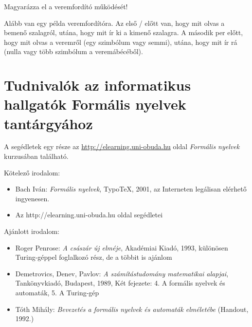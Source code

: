 \documentclass[a4paper]{article}
\begin{document}
Magyarázza el a veremfordító  működését!

Alább van egy példa veremfordítóra. Az első / előtt van, hogy mit olvas
a bemenő szalagról, utána, hogy mit ír ki a kimenő szalagra. A második
per előtt, hogy mit olvas a veremről (egy szimbólum vagy semmi), utána,
hogy mit ír rá (nulla vagy több szimbólum a veremábécéből).



\newpage
\section{Tudnivalók az informatikus hallgatók Formális nyelvek
tantárgyához}
A segédletek egy része az \url{http://elearning.uni-obuda.hu} oldal
\emph{Formális nyelvek} kurzusában található.

\vspace{2ex}

Kötelező irodalom:
\begin{itemize}
\item Bach Iván: \emph{Formális nyelvek}, Typo\TeX, 2001, az Interneten
legálisan elérhető ingyenesen.
\item Az http://elearning.uni-obuda.hu oldal segédletei
\end{itemize}

Ajánlott irodalom:
\begin{itemize}
\item Roger Penrose: \emph{A császár új elméje}, Akadémiai Kiadó, 1993,
különösen Turing-géppel foglalkozó rész, de a többit is ajánlom
\item Demetrovics, Denev, Pavlov: \emph{A számítástudomány matematikai
alapjai}, Tankönyvkiadó, Budapest, 1989,
Két fejezete: 4. A formális nyelvek és automaták, 5. A Turing-gép
\item Tóth Mihály: \emph{Bevezetés a formális nyelvek és automaták
elméletébe} (Handout, 1992.)
\end{itemize}
\end{document}
